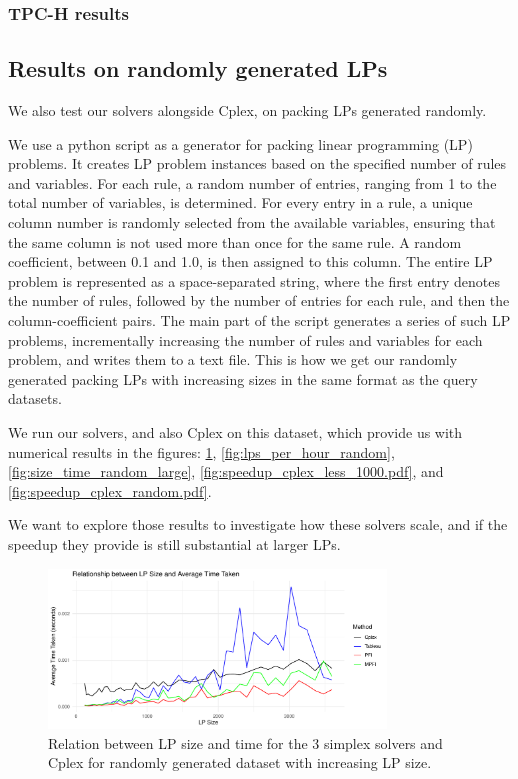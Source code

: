 \subsubsection{TPC-H results}


\subsection{Results on randomly generated LPs}
We also test our solvers alongside Cplex, on packing LPs generated randomly.

We use a python script as a generator for packing linear programming (LP) problems.
It creates LP problem instances
based on the specified number of rules and variables.
For each rule, a random number of entries, ranging from 1 to
the total number of variables, is determined.
For every entry in a rule, a unique column number is randomly selected from
the available variables, ensuring that the same column is not used more than once for
the same rule. A random coefficient, between 0.1 and 1.0, is then assigned to
this column. The entire LP problem is represented as a space-separated string,
where the first entry denotes the number of rules, followed by the number of
entries for each rule, and then the column-coefficient pairs.
The main part of
the script generates a series of such LP problems, incrementally increasing the
number of rules and variables for each problem, and writes them to a text file.
This is how we get our randomly generated packing LPs with increasing sizes in the same format
as the query datasets.

We run our solvers, and also Cplex on this dataset, which provide us with numerical results
in the figures: \ref{fig:time_vs_size_random}, \ref{fig:lps_per_hour_random}, \ref{fig:size_time_random_large},
\ref{fig:speedup_cplex_less_1000.pdf}, and \ref{fig:speedup_cplex_random.pdf}.

We want to
explore those results to investigate how these solvers scale, and if the speedup
they provide is still substantial at larger LPs.


\begin{figure}[!htb]
    \centering
    \includegraphics[width=0.8\textwidth]{figures/time_vs_size_random.pdf}
    \caption{Relation between LP size and time for the 3 simplex solvers and Cplex for randomly generated
        dataset with increasing LP size.}
    \label{fig:time_vs_size_random}
\end{figure}


